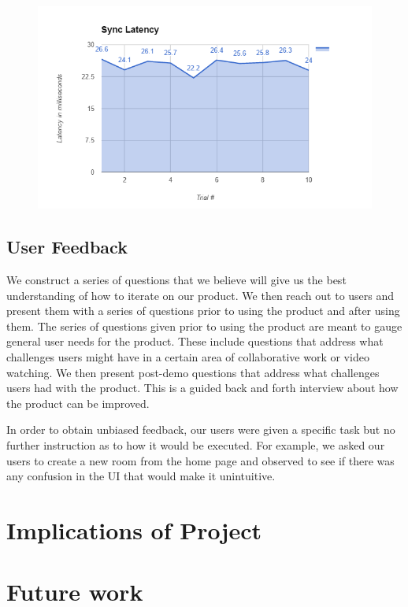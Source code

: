 \documentclass[conference]{IEEEtran}
\begin{document}
    \begin{figure}[H]
      \centering
      \includegraphics[width=\linewidth]{figure4.PNG}
      \caption{}
      \label{fig:my_label}
    \end{figure}

\subsection{User Feedback}
    We construct a series of questions that we believe will give us the best understanding of how to iterate on our product. We then reach out to users and present them with a series of questions prior to using the product and after using them. The series of questions given prior to using the product are meant to gauge general user needs for the product. These include questions that address what challenges users might have in a certain area of collaborative work or video watching. We then present post-demo questions that address what challenges users had with the product. This is a guided back and forth interview about how the product can be improved.

    In order to obtain unbiased feedback, our users were given a specific task but no further instruction as to how it would be executed. For example, we asked our users to create a new room from the home page and observed to see if there was any confusion in the UI that would make it unintuitive.

\section{Implications of Project}

\section{Future work}
\end{document}
